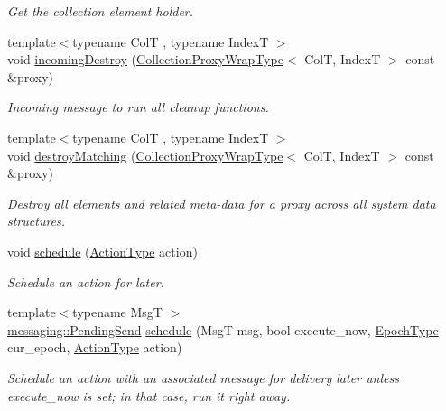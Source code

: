 \begin{DoxyCompactItemize}
\begin{DoxyCompactList}\small\item\em Get the collection element holder. \end{DoxyCompactList}\item 
{\footnotesize template$<$typename ColT , typename IndexT $>$ }\\void \hyperlink{structvt_1_1vrt_1_1collection_1_1_collection_manager_a79d8ce89b21670fe0d482646aca4a2a4}{incoming\+Destroy} (\hyperlink{structvt_1_1vrt_1_1collection_1_1_collection_manager_a56458ed7f9bb22b631b9b3a745f42f94}{Collection\+Proxy\+Wrap\+Type}$<$ ColT, IndexT $>$ const \&proxy)
\begin{DoxyCompactList}\small\item\em Incoming message to run all cleanup functions. \end{DoxyCompactList}\item 
{\footnotesize template$<$typename ColT , typename IndexT $>$ }\\void \hyperlink{structvt_1_1vrt_1_1collection_1_1_collection_manager_afac7551ce2ddeeff21631fa9e6987784}{destroy\+Matching} (\hyperlink{structvt_1_1vrt_1_1collection_1_1_collection_manager_a56458ed7f9bb22b631b9b3a745f42f94}{Collection\+Proxy\+Wrap\+Type}$<$ ColT, IndexT $>$ const \&proxy)
\begin{DoxyCompactList}\small\item\em Destroy all elements and related meta-\/data for a proxy across all system data structures. \end{DoxyCompactList}\item 
void \hyperlink{structvt_1_1vrt_1_1collection_1_1_collection_manager_a7199e829343abd7700dcdcd0a02cd477}{schedule} (\hyperlink{namespacevt_ae0a5a7b18cc99d7b732cb4d44f46b0f3}{Action\+Type} action)
\begin{DoxyCompactList}\small\item\em Schedule an action for later. \end{DoxyCompactList}\item 
{\footnotesize template$<$typename MsgT $>$ }\\\hyperlink{structvt_1_1messaging_1_1_pending_send}{messaging\+::\+Pending\+Send} \hyperlink{structvt_1_1vrt_1_1collection_1_1_collection_manager_aaa19d241c982123103147b568f97b842}{schedule} (MsgT msg, bool execute\+\_\+now, \hyperlink{namespacevt_a81d11b28122d43bf9834577e4a06440f}{Epoch\+Type} cur\+\_\+epoch, \hyperlink{namespacevt_ae0a5a7b18cc99d7b732cb4d44f46b0f3}{Action\+Type} action)
\begin{DoxyCompactList}\small\item\em Schedule an action with an associated message for delivery later unless {\ttfamily execute\+\_\+now} is set; in that case, run it right away. \end{DoxyCompactList}\item 

\end{DoxyCompactItemize}
